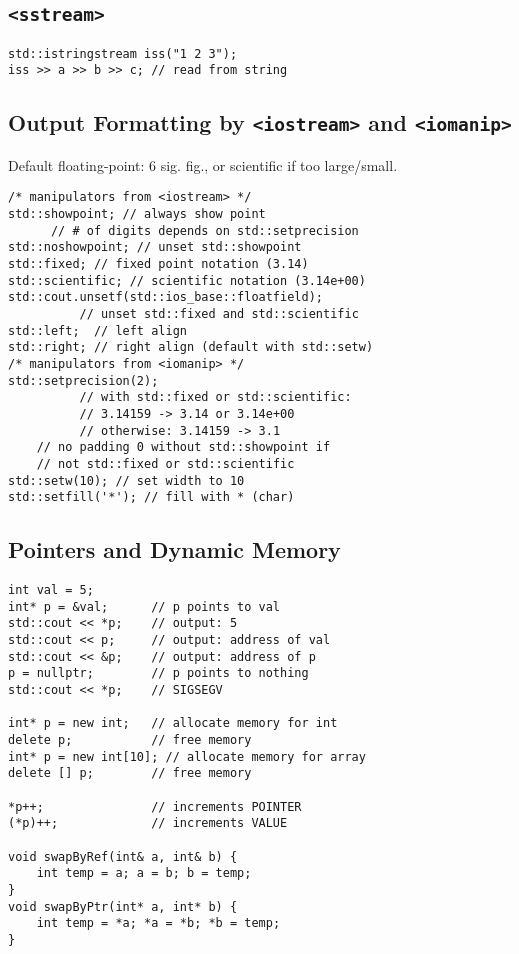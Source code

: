 \subsection*{\texttt{<sstream>}}

\begin{verbatim}
std::istringstream iss("1 2 3");
iss >> a >> b >> c; // read from string
\end{verbatim}
\vspace*{-1.25\baselineskip}

\subsection*{Output Formatting by \texttt{<iostream>} and \texttt{<iomanip>}}

Default floating-point: 6 sig. fig., or scientific if too large/small.
\vspace*{-1.25\baselineskip}
\begin{verbatim}
/* manipulators from <iostream> */
std::showpoint; // always show point
      // # of digits depends on std::setprecision
std::noshowpoint; // unset std::showpoint
std::fixed; // fixed point notation (3.14)
std::scientific; // scientific notation (3.14e+00)
std::cout.unsetf(std::ios_base::floatfield);
          // unset std::fixed and std::scientific
std::left;  // left align
std::right; // right align (default with std::setw)
/* manipulators from <iomanip> */
std::setprecision(2);
          // with std::fixed or std::scientific:
          // 3.14159 -> 3.14 or 3.14e+00
          // otherwise: 3.14159 -> 3.1
    // no padding 0 without std::showpoint if
    // not std::fixed or std::scientific
std::setw(10); // set width to 10
std::setfill('*'); // fill with * (char)

\end{verbatim}
\vspace*{-1.25\baselineskip}

\subsection*{Pointers and Dynamic Memory}
\begin{verbatim}
int val = 5;
int* p = &val;      // p points to val
std::cout << *p;    // output: 5
std::cout << p;     // output: address of val
std::cout << &p;    // output: address of p
p = nullptr;        // p points to nothing
std::cout << *p;    // SIGSEGV

int* p = new int;   // allocate memory for int
delete p;           // free memory
int* p = new int[10]; // allocate memory for array
delete [] p;        // free memory

*p++;               // increments POINTER
(*p)++;             // increments VALUE

void swapByRef(int& a, int& b) {
    int temp = a; a = b; b = temp;
}
void swapByPtr(int* a, int* b) {
    int temp = *a; *a = *b; *b = temp;
}
\end{verbatim}
\vspace*{-1.25\baselineskip}


